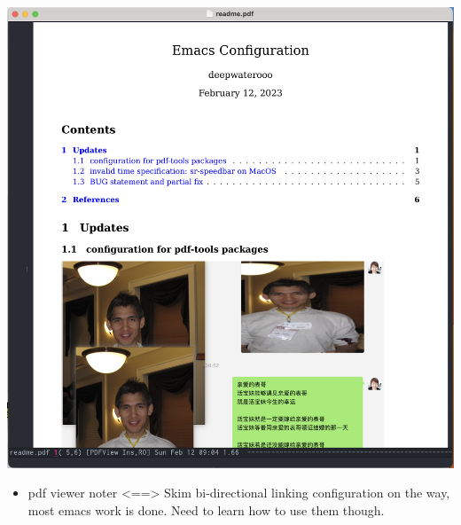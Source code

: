 \documentclass[9pt, b5paper]{article}
\begin{document}
\includegraphics[width=.9\linewidth]{./pic/mememe2.png}
\begin{itemize}
\item pdf viewer noter <==> Skim bi-directional linking configuration on the way, most emacs work is done. Need to learn how to use them though.
\end{itemize}
\end{document}
